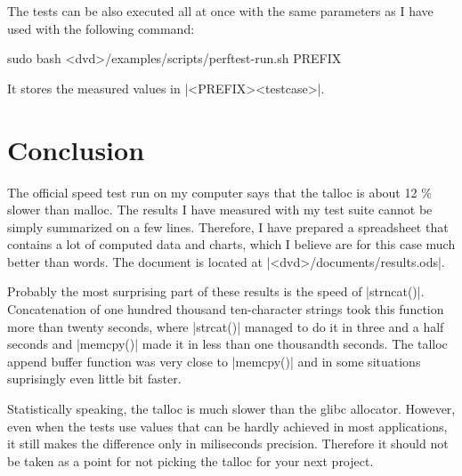 \noindent
The tests can be also executed all at once with the same parameters as I
have used with the following command:
\begin{commandline}
sudo bash <dvd>/examples/scripts/perftest-run.sh PREFIX
\end{commandline}
\funclistend
It stores the measured values in |<PREFIX><testcase>|.

\section{Conclusion}

The official speed test run on my computer says that the talloc is about 12 \%
slower than malloc. The results I have measured with my test suite cannot be
simply summarized on a few lines. Therefore, I have prepared a spreadsheet that
contains a lot of computed data and charts, which I believe are for this
case much better than words. The document is located at
|<dvd>/documents/results.ods|.

Probably the most surprising part of these results is the speed of |strncat()|.
Concatenation of one hundred thousand ten-character strings took
this function more than twenty seconds, where |strcat()| managed to do it in
three and a half seconds and |memcpy()| made it in less than one thousandth
seconds. The talloc append buffer function was very close to |memcpy()| and in
some situations suprisingly even little bit faster.

Statistically speaking, the talloc is much slower than the glibc allocator.
However, even when the tests use values that can be hardly achieved in most
applications, it still makes the difference only in miliseconds precision.
Therefore it should not be taken as a point for not picking the talloc for your
next project.
 